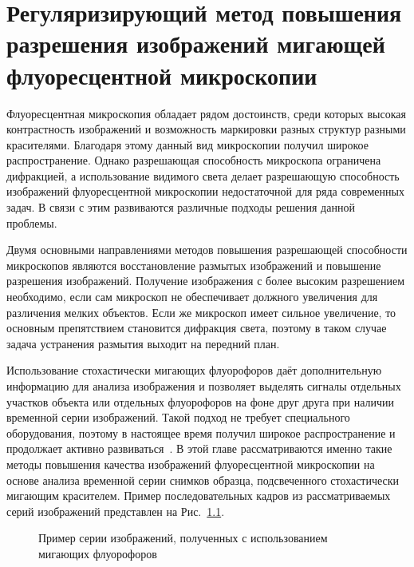 \chapter{Регуляризирующий метод повышения разрешения изображений мигающей флуоресцентной микроскопии}\label{ch:ch1}

Флуоресцентная микроскопия обладает рядом достоинств, среди которых высокая контрастность изображений и возможность маркировки разных структур разными красителями. Благодаря этому данный вид микроскопии получил широкое распространение. Однако разрешающая способность микроскопа ограничена дифракцией, а использование видимого света делает разрешающую способность изображений флуоресцентной микроскопии недостаточной для ряда современных задач. В связи с этим развиваются различные подходы решения данной проблемы.

Двумя основными направлениями методов повышения разрешающей способности микроскопов являются восстановление размытых изображений и повышение разрешения изображений. Получение изображения с более высоким разрешением необходимо, если сам микроскоп не обеспечивает должного увеличения для различения мелких объектов. Если же микроскоп имеет сильное увеличение, то основным препятствием становится дифракция света, поэтому в таком случае задача устранения размытия выходит на передний план.

Использование стохастически мигающих флуорофоров даёт дополнительную информацию для анализа изображения и позволяет выделять сигналы отдельных участков объекта или отдельных флуорофоров на фоне друг друга при наличии временной серии изображений. Такой подход не требует специального оборудования, поэтому в настоящее время получил широкое распространение и продолжает активно развиваться~\cite{мишин2019флуоресцентная}. В этой главе рассматриваются именно такие методы повышения качества изображений флуоресцентной микроскопии на основе анализа временной серии снимков образца, подсвеченного стохастически мигающим красителем. Пример последовательных кадров из рассматриваемых серий изображений представлен на Рис.~\ref{fig:blinking-samples}.

\begin{figure}[ht]
	\caption{Пример серии изображений, полученных с использованием мигающих флуорофоров}
	\label{fig:blinking-samples}
\end{figure}

